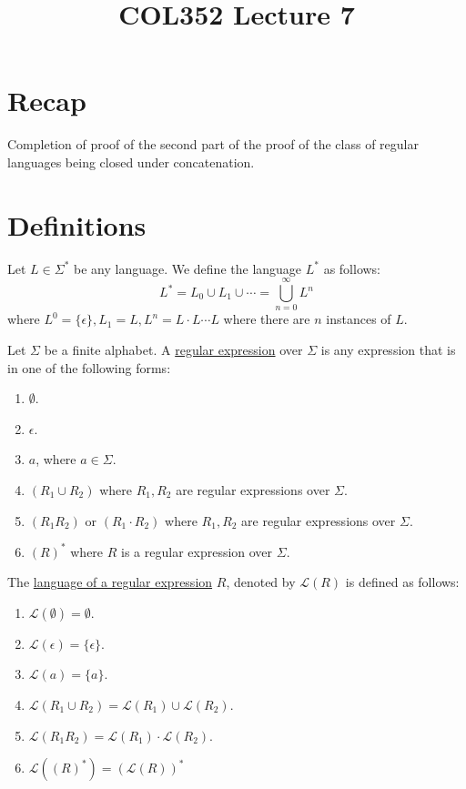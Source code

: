 \documentclass[a4paper]{article}
\title{\textbf{COL352 Lecture 7}}
\date{}
\newcommand{\mc}{\mathcal}
\renewcommand{\L}{\mc{L}}
\begin{document}
\maketitle
\tableofcontents

\section{Recap}

Completion of proof of the second part of the proof of the class of regular languages being closed under concatenation.

\section{Definitions}

\begin{defn}
    Let $L \in \Sigma^*$ be any language. We define the language $L^*$ as follows:
    \[
        L^* = L_0 \cup L_1 \cup \cdots = \bigcup_{n=0}^\infty L^n
    \]
    where $L^0 = \{\epsilon\}, L_1 = L, L^n = L\cdot L \cdots L$ where there are $n$ instances of $L$.
\end{defn}

\begin{defn}
    Let $\Sigma$ be a finite alphabet. A \underline{regular expression} over $\Sigma$ is any expression that is in one of the following forms:
    \begin{enumerate}
        \item $\emptyset$.
        \item $\epsilon$.
        \item $a$, where $a \in \Sigma$.
        \item $(R_1 \cup R_2)$ where $R_1, R_2$ are regular expressions over $\Sigma$.
        \item $(R_1R_2)$ or $(R_1 \cdot R_2)$ where $R_1, R_2$ are regular expressions over $\Sigma$.
        \item $(R)^*$ where $R$ is a regular expression over $\Sigma$.
    \end{enumerate}
\end{defn}

\begin{defn}
    The \underline{language of a regular expression} $R$, denoted by $\mc{L}(R)$ is defined as follows:
    \begin{enumerate}
        \item $\mc{L}(\emptyset) = \emptyset$.
        \item $\mc{L}(\epsilon) = \{\epsilon\}$.
        \item $\mc{L}(a) = \{a\}$.
        \item $\mc{L}(R_1 \cup R_2) = \mc{L}(R_1) \cup \mc{L}(R_2)$.
        \item $\mc{L}(R_1R_2) = \mc{L}(R_1) \cdot \L(R_2)$.
        \item $\mc{L}\left((R)^*\right) = \left(\mc{L}(R)\right)^*$
    \end{enumerate}
\end{defn}
\end{document}
